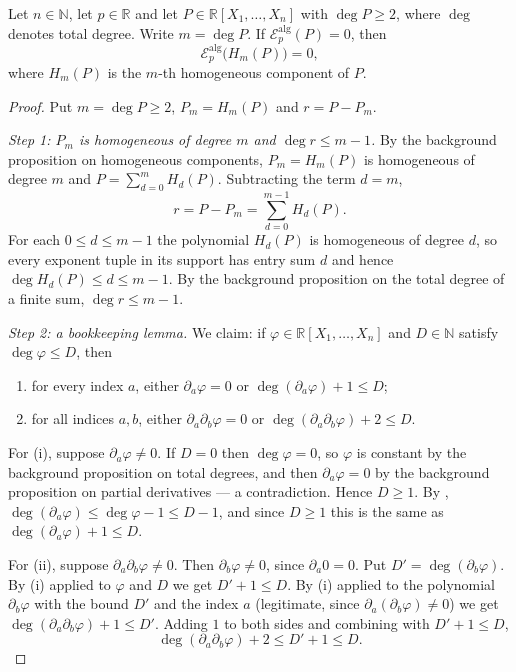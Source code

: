 \begin{lemma}
Let $n\in\mathbb{N}$, let $p\in\mathbb{R}$ and let
$P\in\mathbb{R}[X_1,\dots,X_n]$ with $\deg P\ge2$, where $\deg$ denotes total
degree. Write $m=\deg P$. If $\mathcal{E}^{\mathrm{alg}}_p(P)=0$, then
\[
  \mathcal{E}^{\mathrm{alg}}_p\bigl(H_m(P)\bigr)=0,
\]
where $H_m(P)$ is the $m$-th homogeneous component of $P$.
\end{lemma}
\begin{proof}
Put $m=\deg P\ge2$, $P_m=H_m(P)$ and $r=P-P_m$.

\emph{Step 1: $P_m$ is homogeneous of degree $m$ and $\deg r\le m-1$.} By the
background proposition on homogeneous components, $P_m=H_m(P)$ is homogeneous of
degree $m$ and $P=\sum_{d=0}^{m}H_d(P)$. Subtracting the term $d=m$,
\[
  r=P-P_m=\sum_{d=0}^{m-1}H_d(P).
\]
For each $0\le d\le m-1$ the polynomial $H_d(P)$ is homogeneous of degree $d$,
so every exponent tuple in its support has entry sum $d$ and hence
$\deg H_d(P)\le d\le m-1$. By the background proposition on the total degree of
a finite sum, $\deg r\le m-1$.

\emph{Step 2: a bookkeeping lemma.} We claim: if $\varphi\in\mathbb{R}[X_1,\dots,X_n]$
and $D\in\mathbb{N}$ satisfy $\deg\varphi\le D$, then
\begin{enumerate}
\item[(i)] for every index $a$, either $\partial_a\varphi=0$ or
  $\deg(\partial_a\varphi)+1\le D$;
\item[(ii)] for all indices $a,b$, either $\partial_a\partial_b\varphi=0$ or
  $\deg(\partial_a\partial_b\varphi)+2\le D$.
\end{enumerate}

For (i), suppose $\partial_a\varphi\ne0$. If $D=0$ then $\deg\varphi=0$, so
$\varphi$ is constant by the background proposition on total degrees, and then
$\partial_a\varphi=0$ by the background proposition on partial derivatives — a
contradiction. Hence $D\ge1$. By ,
$\deg(\partial_a\varphi)\le\deg\varphi-1\le D-1$, and since $D\ge1$ this is the
same as $\deg(\partial_a\varphi)+1\le D$.

For (ii), suppose $\partial_a\partial_b\varphi\ne0$. Then $\partial_b\varphi\ne0$,
since $\partial_a0=0$. Put $D'=\deg(\partial_b\varphi)$. By (i) applied to
$\varphi$ and $D$ we get $D'+1\le D$. By (i) applied to the polynomial
$\partial_b\varphi$ with the bound $D'$ and the index $a$ (legitimate, since
$\partial_a(\partial_b\varphi)\ne0$) we get
$\deg(\partial_a\partial_b\varphi)+1\le D'$. Adding $1$ to both sides and
combining with $D'+1\le D$,
\[
  \deg(\partial_a\partial_b\varphi)+2\le D'+1\le D .
\]


\end{proof}
